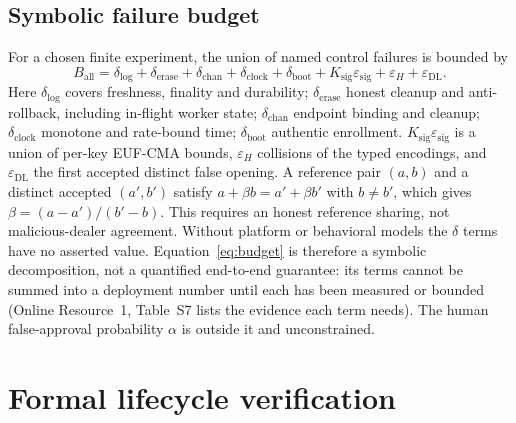\documentclass[pdflatex,sn-mathphys-num]{sn-jnl}%
\theoremstyle{plain}
\theoremstyle{definition}
\begin{document}
\subsection{Symbolic failure budget}
For a chosen finite experiment, the union of named control failures is bounded by
\begin{equation}\label{eq:budget}
 B_{\mathrm{all}}=\delta_{\mathrm{log}}+\delta_{\mathrm{erase}}+\delta_{\mathrm{chan}}+\delta_{\mathrm{clock}}+\delta_{\mathrm{boot}}+K_{\mathrm{sig}}\varepsilon_{\mathrm{sig}}+\varepsilon_H+\varepsilon_{\mathrm{DL}}.
\end{equation}
Here $\delta_{\mathrm{log}}$ covers freshness, finality and durability; $\delta_{\mathrm{erase}}$ honest cleanup and anti-rollback, including in-flight worker state; $\delta_{\mathrm{chan}}$ endpoint binding and cleanup; $\delta_{\mathrm{clock}}$ monotone and rate-bound time; $\delta_{\mathrm{boot}}$ authentic enrollment. $K_{\mathrm{sig}}\varepsilon_{\mathrm{sig}}$ is a union of per-key EUF-CMA bounds, $\varepsilon_H$ collisions of the typed encodings, and $\varepsilon_{\mathrm{DL}}$ the first accepted distinct false opening. A reference pair $(a,b)$ and a distinct accepted $(a',b')$ satisfy $a+\beta b=a'+\beta b'$ with $b\ne b'$, which gives $\beta=(a-a')/(b'-b)$. This requires an honest reference sharing, not malicious-dealer agreement. Without platform or behavioral models the $\delta$ terms have no asserted value. Equation~\eqref{eq:budget} is therefore a symbolic decomposition, not a quantified end-to-end guarantee: its terms cannot be summed into a deployment number until each has been measured or bounded (Online Resource~1, Table~S7 lists the evidence each term needs). The human false-approval probability $\alpha$ is outside it and unconstrained.



\section{Formal lifecycle verification}\label{sec:formal}
\end{document}
